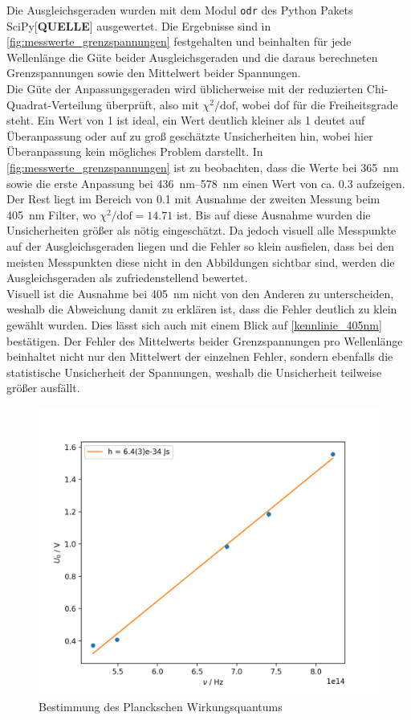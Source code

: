 Die Ausgleichsgeraden wurden mit dem Modul \verb|odr| des Python Pakets SciPy[\textbf{QUELLE}]
ausgewertet. Die Ergebnisse sind in \cref{fig:messwerte_grenzspannungen} festgehalten
und beinhalten für jede Wellenlänge die Güte beider Ausgleichsgeraden und die daraus berechneten
Grenzspannungen sowie den Mittelwert beider Spannungen. \\

Die Güte der Anpassungsgeraden
wird üblicherweise mit der reduzierten Chi-Quadrat-Verteilung überprüft, also mit
$\chi^2 / \mathrm{dof}$, wobei dof für die Freiheitsgrade steht. Ein Wert von 1 ist ideal,
ein Wert deutlich kleiner als 1 deutet auf Überanpassung oder auf zu groß geschätzte
Unsicherheiten hin, wobei hier Überanpassung kein mögliches Problem darstellt.
In \cref{fig:messwerte_grenzspannungen} ist zu beobachten, dass die Werte bei \SI{365}{\nano\meter}
sowie die erste Anpassung bei \qtyrange{436}{578}{\nano\meter} einen Wert von ca. \num{0.3}
aufzeigen. Der Rest liegt im Bereich von \num{0.1} mit Ausnahme der zweiten Messung beim
\SI{405}{\nano\meter} Filter, wo $\chi^2/\mathrm{dof} = \num{14.71}$ ist. Bis
auf diese Ausnahme wurden die Unsicherheiten größer als nötig eingeschätzt. Da jedoch
visuell alle Messpunkte auf der Ausgleichsgeraden liegen und die Fehler so klein ausfielen, dass
bei den meisten Messpunkten diese nicht in den Abbildungen sichtbar sind, werden die
Ausgleichsgeraden als zufriedenstellend bewertet. \\

Visuell ist die Ausnahme
bei \SI{405}{\nano\meter} nicht von den Anderen zu unterscheiden, weshalb die Abweichung
damit zu erklären ist, dass die Fehler deutlich zu klein gewählt wurden.
Dies lässt sich auch mit einem Blick auf \cref{kennlinie_405nm} bestätigen.
Der Fehler des Mittelwerts beider Grenzspannungen pro Wellenlänge beinhaltet
nicht nur den Mittelwert der einzelnen Fehler, sondern ebenfalls die statistische Unsicherheit
der Spannungen, weshalb die Unsicherheit teilweise größer ausfällt.\\

\begin{figure}[htb]
	\centering
	\includegraphics[width=0.75\linewidth]{../figs/photozelle_wirkungsquantum.png}
	\caption{Bestimmung des Planckschen Wirkungsquantums}
	\label{fig:bestimmung_planck}
\end{figure}

